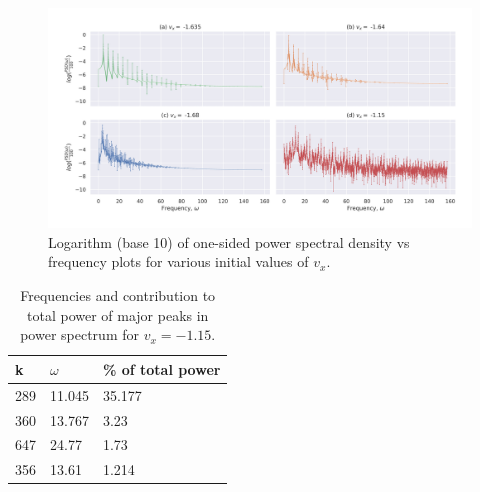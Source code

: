 \documentclass[a4paper]{article}
\begin{document}
		\begin{figure}
			\includegraphics[width=\columnwidth]{../task2/plots/q1-5_log.jpg}
			\caption{Logarithm (base 10) of one-sided power spectral density vs frequency plots for various initial values of \(v_x\).}
			\label{fig:task2_log}
		\end{figure}
		
		\begin{table}
			\centering
			\begin{tabular} {l l l}
				\toprule
				\textbf{k} & \textbf{\(\omega\)} & \textbf{\% of total power} \\
				\midrule
				289 & 11.045 & 35.177 \\ 
				360 & 13.767 & 3.23 \\
				647 & 24.77 & 1.73 \\
				356 & 13.61 & 1.214 \\
				\bottomrule
			\end{tabular}
			\caption{Frequencies and contribution to total power of major peaks in power spectrum for \(v_x=-1.15\).}
			\label{table:task2_5}
		\end{table}
		
\end{document}
